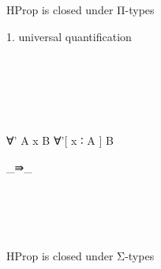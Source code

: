 HProp is closed under Π-types

1. universal quantification

\begin{code}\>\<%
\\
%
\\
\> \AgdaSymbol{:} \AgdaSymbol{(} \AgdaSymbol{:} \AgdaSymbol{)(} \AgdaSymbol{:}   \AgdaSymbol{)}  \<%
\\
\>   \AgdaSymbol{=}  \AgdaSymbol{((} \AgdaSymbol{:} \AgdaSymbol{)}  \AgdaFunction{<}   \AgdaFunction{>}\AgdaSymbol{)} \AgdaSymbol{(}     \AgdaSymbol{(} \AgdaSymbol{)))}\<%
\\
%
\\
\> ∀' A  x  B\AgdaSymbol{)} \AgdaSymbol{=} ∀'[ x ∶ A ] B

  \_⇛\_\<%
\\
%
\\
\> \AgdaSymbol{:} \AgdaSymbol{(}  \AgdaSymbol{:} \AgdaSymbol{)}  \<%
\\
\>   \AgdaSymbol{=} \<[9]%
\>[9] \AgdaFunction{<}  \AgdaFunction{>}  \AgdaBound{\_}  \AgdaSymbol{)}\<%
\\
%
\\
\>\<\end{code}

HProp is closed under Σ-types

